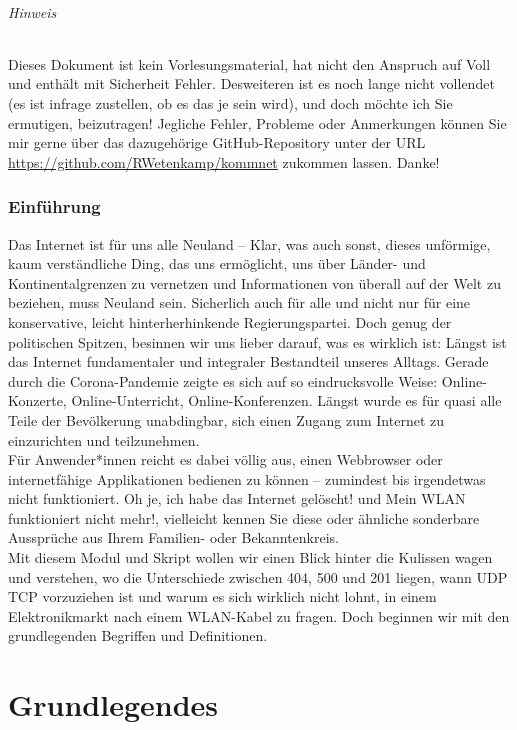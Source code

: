 \documentclass[11pt,a4paper]{scrartcl}
\begin{document}
\paragraph{Hinweis}
Dieses Dokument ist kein Vorlesungsmaterial, hat nicht den Anspruch auf {Voll} und enthält mit Sicherheit Fehler. Desweiteren ist es noch lange nicht vollendet (es ist infrage zustellen, ob es das je sein wird), und doch möchte ich Sie ermutigen, beizutragen! Jegliche Fehler, Probleme oder Anmerkungen können Sie mir gerne über das dazugehörige GitHub-Repository unter der URL \url{https://github.com/RWetenkamp/kommnet} zukommen lassen. Danke!
\pagebreak
\section{Einführung}
Das Internet ist für uns alle Neuland -- Klar, was auch sonst, dieses unförmige, kaum verständliche Ding, das uns ermöglicht, uns über Länder- und Kontinentalgrenzen zu vernetzen und Informationen von überall auf der Welt zu beziehen, muss Neuland sein. Sicherlich auch für alle und nicht nur für eine konservative, leicht hinterherhinkende Regierungspartei. Doch genug der politischen Spitzen, besinnen wir uns lieber darauf, was es wirklich ist: Längst ist das Internet fundamentaler und integraler Bestandteil unseres Alltags. Gerade durch die Corona-Pandemie zeigte es sich auf so eindrucksvolle Weise: Online-Konzerte, Online-Unterricht, Online-Konferenzen. Längst wurde es für quasi alle Teile der Bevölkerung unabdingbar, sich einen Zugang zum Internet zu einzurichten und teilzunehmen. \\
Für Anwender*innen reicht es dabei völlig aus, einen Webbrowser oder internetfähige Applikationen bedienen zu können -- zumindest bis irgendetwas nicht funktioniert. {\glqq}Oh je, ich habe das Internet gelöscht!{\grqq} und {\glqq}Mein WLAN funktioniert nicht mehr!{\grqq}, vielleicht kennen Sie diese oder ähnliche sonderbare Aussprüche aus Ihrem Familien- oder Bekanntenkreis. \\
Mit diesem Modul und Skript wollen wir einen Blick hinter die Kulissen wagen und verstehen, wo die Unterschiede zwischen 404, 500 und 201 liegen, wann UDP TCP vorzuziehen ist und warum es sich wirklich nicht lohnt, in einem Elektronikmarkt nach einem WLAN-Kabel zu fragen. Doch beginnen wir mit den grundlegenden Begriffen und Definitionen.
\part{Grundlegendes}
\end{document}
